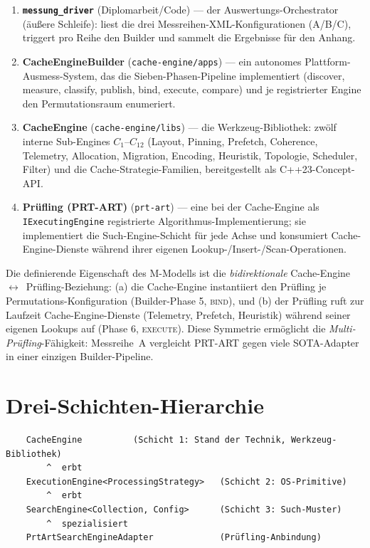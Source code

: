 \begin{enumerate}
  \item \textbf{\texttt{messung\_driver}} (Diplomarbeit/Code) --- der Auswertungs-Orchestrator
        (äußere Schleife): liest die drei Messreihen-XML-Konfigurationen (A/B/C), triggert pro
        Reihe den Builder und sammelt die Ergebnisse für den Anhang.
  \item \textbf{CacheEngineBuilder} (\texttt{cache-engine/apps}) --- ein autonomes
        Plattform-Ausmess-System, das die Sieben-Phasen-Pipeline implementiert (discover,
        measure, classify, publish, bind, execute, compare) und je registrierter Engine den
        Permutationsraum enumeriert.
  \item \textbf{CacheEngine} (\texttt{cache-engine/libs}) --- die Werkzeug-Bibliothek: zwölf
        interne Sub-Engines $C_1$--$C_{12}$ (Layout, Pinning, Prefetch, Coherence, Telemetry,
        Allocation, Migration, Encoding, Heuristik, Topologie, Scheduler, Filter) und die
        Cache-Strategie-Familien, bereitgestellt als C++23-Concept-API.
  \item \textbf{Prüfling (PRT-ART)} (\texttt{prt-art}) --- eine bei der Cache-Engine als
        \texttt{IExecutingEngine} registrierte Algorithmus-Implementierung; sie implementiert
        die Such-Engine-Schicht für jede Achse und konsumiert Cache-Engine-Dienste während
        ihrer eigenen Lookup-/Insert-/Scan-Operationen.
\end{enumerate}

Die definierende Eigenschaft des M-Modells ist die \emph{bidirektionale}
Cache-Engine~$\leftrightarrow$~Prüfling-Beziehung: (a) die Cache-Engine instantiiert den
Prüfling je Permutations-Konfiguration (Builder-Phase 5, \textsc{bind}), und (b) der Prüfling
ruft zur Laufzeit Cache-Engine-Dienste (Telemetry, Prefetch, Heuristik) während seiner eigenen
Lookups auf (Phase 6, \textsc{execute}). Diese Symmetrie ermöglicht die
\emph{Multi-Prüfling}-Fähigkeit: Messreihe~A vergleicht PRT-ART gegen viele SOTA-Adapter in
einer einzigen Builder-Pipeline.

\section{Drei-Schichten-Hierarchie}\label{sec:three-layer}

\begin{verbatim}
    CacheEngine          (Schicht 1: Stand der Technik, Werkzeug-Bibliothek)
        ^  erbt
    ExecutionEngine<ProcessingStrategy>   (Schicht 2: OS-Primitive)
        ^  erbt
    SearchEngine<Collection, Config>      (Schicht 3: Such-Muster)
        ^  spezialisiert
    PrtArtSearchEngineAdapter             (Prüfling-Anbindung)
\end{verbatim}

